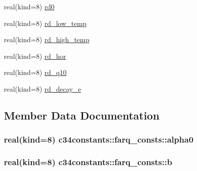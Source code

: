\begin{DoxyCompactItemize}
\item 
real(kind=8) \hyperlink{structc34constants_1_1farq__consts_a69a48d8df8477c75ca42fa00fc9b7f4e}{rd0}
\item 
real(kind=8) \hyperlink{structc34constants_1_1farq__consts_aed622c485dc8a91b7c7ec180a6a905b3}{rd\+\_\+low\+\_\+temp}
\item 
real(kind=8) \hyperlink{structc34constants_1_1farq__consts_aead3f1dc90f03eca3990e692d2cceb05}{rd\+\_\+high\+\_\+temp}
\item 
real(kind=8) \hyperlink{structc34constants_1_1farq__consts_aed74b55c0daee2fe235e1f948dac1a93}{rd\+\_\+hor}
\item 
real(kind=8) \hyperlink{structc34constants_1_1farq__consts_a4bb81d3f16d5f934ce4c07c1a47ad13f}{rd\+\_\+q10}
\item 
real(kind=8) \hyperlink{structc34constants_1_1farq__consts_a3ff8dd1a8307cc3da9f1e082c0abd2f7}{rd\+\_\+decay\+\_\+e}
\end{DoxyCompactItemize}


\subsection{Member Data Documentation}
\subsubsection[{\texorpdfstring{alpha0}{alpha0}}]{\setlength{\rightskip}{0pt plus 5cm}real(kind=8) c34constants\+::farq\+\_\+consts\+::alpha0}\hypertarget{structc34constants_1_1farq__consts_ac07e1eade4d8432242f00aafbbc04b32}{}\label{structc34constants_1_1farq__consts_ac07e1eade4d8432242f00aafbbc04b32}
\subsubsection[{\texorpdfstring{b}{b}}]{\setlength{\rightskip}{0pt plus 5cm}real(kind=8) c34constants\+::farq\+\_\+consts\+::b}\hypertarget{structc34constants_1_1farq__consts_a02ff4801f693aa83da862b00607461d3}{}\label{structc34constants_1_1farq__consts_a02ff4801f693aa83da862b00607461d3}
